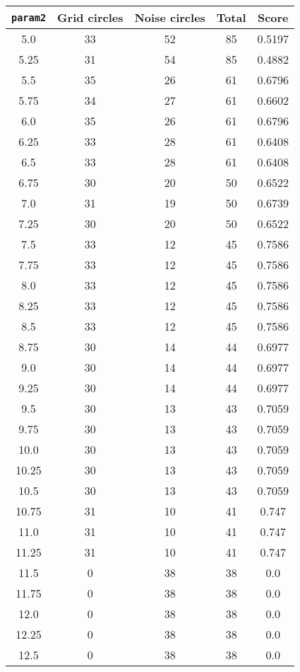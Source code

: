 \documentclass[letterpaper, 12pt]{article}
\begin{document}
\begin{longtable}{|c|c|c|c|c|}
\hline
\textbf{\texttt{param2}} & \textbf{Grid circles} & \textbf{Noise circles} & \textbf{Total} & \textbf{Score} \\
\hline
5.0 & 33 & 52 & 85 & 0.5197 \\
\hline
5.25 & 31 & 54 & 85 & 0.4882 \\
\hline
5.5 & 35 & 26 & 61 & 0.6796 \\
\hline
5.75 & 34 & 27 & 61 & 0.6602 \\
\hline
6.0 & 35 & 26 & 61 & 0.6796 \\
\hline
6.25 & 33 & 28 & 61 & 0.6408 \\
\hline
6.5 & 33 & 28 & 61 & 0.6408 \\
\hline
6.75 & 30 & 20 & 50 & 0.6522 \\
\hline
7.0 & 31 & 19 & 50 & 0.6739 \\
\hline
7.25 & 30 & 20 & 50 & 0.6522 \\
\hline
7.5 & 33 & 12 & 45 & 0.7586 \\
\hline
7.75 & 33 & 12 & 45 & 0.7586 \\
\hline
8.0 & 33 & 12 & 45 & 0.7586 \\
\hline
8.25 & 33 & 12 & 45 & 0.7586 \\
\hline
8.5 & 33 & 12 & 45 & 0.7586 \\
\hline
8.75 & 30 & 14 & 44 & 0.6977 \\
\hline
9.0 & 30 & 14 & 44 & 0.6977 \\
\hline
9.25 & 30 & 14 & 44 & 0.6977 \\
\hline
9.5 & 30 & 13 & 43 & 0.7059 \\
\hline
9.75 & 30 & 13 & 43 & 0.7059 \\
\hline
10.0 & 30 & 13 & 43 & 0.7059 \\
\hline
10.25 & 30 & 13 & 43 & 0.7059 \\
\hline
10.5 & 30 & 13 & 43 & 0.7059 \\
\hline
10.75 & 31 & 10 & 41 & 0.747 \\
\hline
11.0 & 31 & 10 & 41 & 0.747 \\
\hline
11.25 & 31 & 10 & 41 & 0.747 \\
\hline
11.5 & 0 & 38 & 38 & 0.0 \\
\hline
11.75 & 0 & 38 & 38 & 0.0 \\
\hline
12.0 & 0 & 38 & 38 & 0.0 \\
\hline
12.25 & 0 & 38 & 38 & 0.0 \\
\hline
12.5 & 0 & 38 & 38 & 0.0 \\

\end{longtable}
\end{document}
